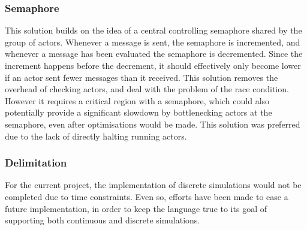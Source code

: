 \subsubsection{Semaphore}

This solution builds on the idea of a central controlling semaphore shared by the group of actors. Whenever a message is sent, the semaphore is incremented, and whenever a message has been evaluated the semaphore is decremented. Since the increment happens before the decrement, it should effectively only become lower if an actor sent fewer messages than it received. This solution removes the overhead of checking actors, and deal with the problem of the race condition. However it requires a critical region with a semaphore, which could also potentially provide a significant slowdown by bottlenecking actors at the semaphore, even after optimisations would be made. This solution was preferred due to the lack of directly halting running actors.

\subsubsection{Delimitation}

For the current project, the implementation of discrete simulations would not be completed due to time constraints. Even so, efforts have been made to ease a future implementation, in order to keep the language true to its goal of supporting both continuous and discrete simulations.